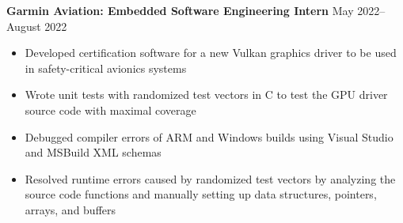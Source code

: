\documentclass{article}
\begin{document}
\vspace{1em}
\textbf{Garmin Aviation: Embedded Software Engineering Intern}
\hfill
\vspace{0.5em}
May 2022--August 2022
\begin{itemize}
\item{Developed certification software for a new Vulkan graphics driver to be used in safety-critical avionics systems}
\item{Wrote unit tests with randomized test vectors in C to test the GPU driver source code with maximal coverage}
\item{Debugged compiler errors of ARM and Windows builds using Visual Studio and MSBuild XML schemas}
\item{Resolved runtime errors caused by randomized test vectors by analyzing the source code functions and manually setting up data structures, pointers, arrays, and buffers}
\end{itemize}
\end{document}
